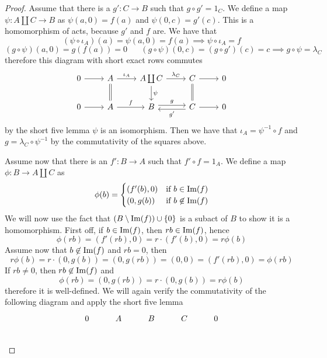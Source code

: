\begin{proof}[Proof]
    Assume that there is a $g':C \to B$ such that $g\circ g' = 1_C$. We define a map $\psi: A\coprod C \to B$ as 
    $\psi(a,0) = f(a)$ and $\psi(0,c) = g'(c)$. This is a homomorphism of acts, because $g'$ and $f$ are. We have that 
    \[
        (\psi\circ \iota_A)(a) = \psi(a,0) = f(a) \implies \psi\circ\iota_A = f
    \]
    \[
        (g\circ\psi)(a,0) = g(f(a)) = 0\hspace{20pt} (g\circ\psi)(0,c) = (g\circ g')(c) = c \implies g\circ\psi = \lambda_C
    \]
    therefore this diagram with short exact rows commutes
    \[\begin{tikzcd}
	0 & A & {A\coprod C} & C & 0 \\
	0 & A & B & C & 0
	\arrow[from=1-1, to=1-2]
	\arrow["{\iota_A}", from=1-2, to=1-3]
	\arrow[equal,from=1-2, to=2-2]
	\arrow["{\lambda_C}", from=1-3, to=1-4]
	\arrow["\psi", from=1-3, to=2-3]
	\arrow[from=1-4, to=1-5]
	\arrow[equal,from=1-4, to=2-4]
	\arrow[from=2-1, to=2-2]
	\arrow["f", from=2-2, to=2-3]
	\arrow["g", shift left, from=2-3, to=2-4]
	\arrow["{g'}", shift left, from=2-4, to=2-3]
	\arrow[from=2-4, to=2-5]
\end{tikzcd}\]
    by the short five lemma $\psi$ is an isomorphism. Then we have that $\iota_A = \psi^{-1}\circ f$ and $g = \lambda_C\circ\psi^{-1}$ 
    by the commutativity of the squares above.\par 
    Assume now that there is an $f': B \to A$ such that $f'\circ f = 1_A$. We define a map $\phi: B \to A\coprod C$ as
    \[
        \phi(b) = \begin{cases}
            (f'(b),0) & \text{if } b\in\mathrm{Im}(f) \\
            (0,g(b)) & \text{if } b\not\in\mathrm{Im}(f)
        \end{cases}
    \]
    We will now use the fact that $(B\setminus\mathrm{Im}(f))\cup\{0\}$ is a subact of $B$ to show it is a homomorphism. First off, if 
    $b\in\mathrm{Im}(f)$, then $rb\in\mathrm{Im}(f)$, hence 
    \[
    \phi(rb) = (f'(rb),0)= r\cdot(f'(b),0) = r\phi(b)
    \]
    Assume now that $b\not\in\mathrm{Im}(f)$ and $rb=0$, then 
    \[
        r\phi(b) = r\cdot(0,g(b)) = (0,g(rb)) = (0,0) = (f'(rb),0) = \phi(rb)
    \]
    If $rb\neq 0$, then $rb\not\in\mathrm{Im}(f)$ and 
    \[
        \phi(rb) = (0,g(rb)) = r\cdot(0,g(b)) = r\phi(b)
    \]
    therefore it is well-defined. We will again verify the commutativity of the following diagram and apply the short five lemma
    \[\begin{tikzcd}
        0 & A & B & C & 0 \\

\end{tikzcd}\]
\end{proof}
